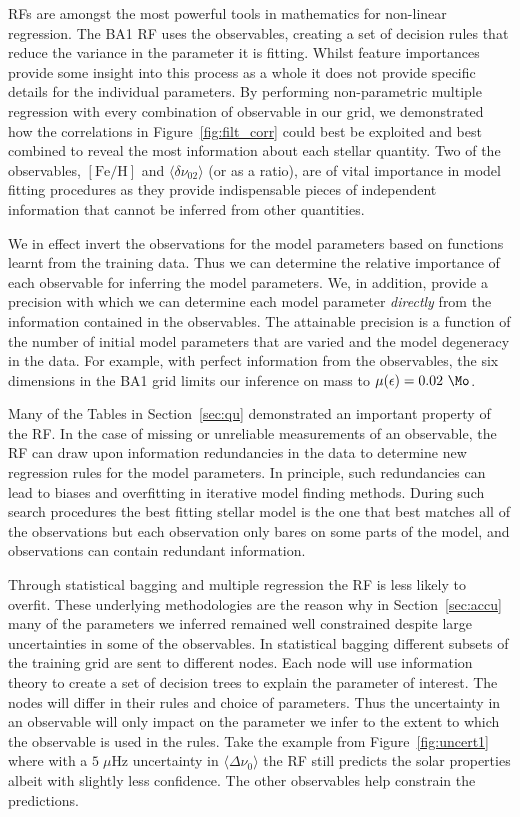 RFs are amongst the most powerful tools in mathematics for non-linear regression. 
The BA1 RF uses the observables, creating a set of decision rules that reduce the variance in the parameter it is fitting.
Whilst feature importances provide some insight into this process as a whole it does not provide specific details for the individual parameters. 
By performing non-parametric multiple regression with every combination of observable in our grid,  
we demonstrated how the correlations in Figure~\ref{fig:filt_corr} could best be exploited and best combined to reveal the most information about each stellar quantity.
Two of the observables, ${[\text{Fe/H}]}$ and ${\langle\delta\nu_{02}\rangle}$ (or as a ratio),  are of vital importance in model fitting procedures as they provide indispensable pieces of independent information that cannot be inferred from other quantities.  

We in effect invert the observations for the model parameters based on functions learnt from the training data. 
Thus we can determine the relative importance of each observable for inferring the model parameters. We, in addition, provide a precision with which we can determine each model parameter \emph{directly} from the information contained in the observables. 
The attainable precision is a function of the number of initial model parameters that are varied and the model degeneracy in the data. 
For example, with perfect information from the observables, the six dimensions in the BA1 grid limits our inference on mass to 
${\mu (\epsilon) =0.02 \ \Mo}$. 


Many of the Tables in Section~\ref{sec:qu} demonstrated an important property of the RF. 
In the case of missing or unreliable measurements of an observable, the RF can draw upon information redundancies in the data to determine new regression rules for the model parameters.
In principle, such redundancies can lead to biases and overfitting in iterative model finding methods.
During such search procedures the best fitting stellar model is the one that best matches all of the observations but each observation only bares on some parts of the model, and observations can contain redundant information.
%


Through statistical bagging and multiple regression the RF is less likely to overfit. %
These underlying methodologies are the reason why in Section~\ref{sec:accu} many of the parameters we inferred remained well constrained despite large uncertainties in some of the observables.   
In statistical bagging different subsets of the training grid are sent to different nodes. Each node will use information theory to create a set of decision trees to explain the parameter of interest. The nodes will differ in their rules and choice of parameters. Thus the uncertainty in an observable will only impact on the parameter we infer to the extent to which the observable is used in the rules.  
Take the example from Figure~\ref{fig:uncert1} where with a ${5\;\mu}$Hz uncertainty in ${\langle\Delta\nu_0\rangle}$ the RF still predicts the solar properties albeit with slightly less confidence.
The other observables help constrain the predictions. 

